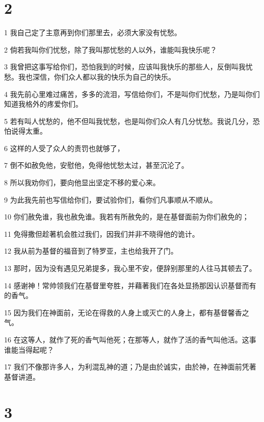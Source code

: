 \chapter{2}

\par 1 我自己定了主意再到你们那里去，必须大家没有忧愁。
\par 2 倘若我叫你们忧愁，除了我叫那忧愁的人以外，谁能叫我快乐呢？
\par 3 我曾把这事写给你们，恐怕我到的时候，应该叫我快乐的那些人，反倒叫我忧愁。我也深信，你们众人都以我的快乐为自己的快乐。
\par 4 我先前心里难过痛苦，多多的流泪，写信给你们，不是叫你们忧愁，乃是叫你们知道我格外的疼爱你们。
\par 5 若有叫人忧愁的，他不但叫我忧愁，也是叫你们众人有几分忧愁。我说几分，恐怕说得太重。
\par 6 这样的人受了众人的责罚也就够了，
\par 7 倒不如赦免他，安慰他，免得他忧愁太过，甚至沉沦了。
\par 8 所以我劝你们，要向他显出坚定不移的爱心来。
\par 9 为此我先前也写信给你们，要试验你们，看你们凡事顺从不顺从。
\par 10 你们赦免谁，我也赦免谁。我若有所赦免的，是在基督面前为你们赦免的；
\par 11 免得撒但趁著机会胜过我们，因我们并非不晓得他的诡计。
\par 12 我从前为基督的福音到了特罗亚，主也给我开了门。
\par 13 那时，因为没有遇见兄弟提多，我心里不安，便辞别那里的人往马其顿去了。
\par 14 感谢神！常帅领我们在基督里夸胜，并藉著我们在各处显扬那因认识基督而有的香气。
\par 15 因为我们在神面前，无论在得救的人身上或灭亡的人身上，都有基督馨香之气。
\par 16 在这等人，就作了死的香气叫他死；在那等人，就作了活的香气叫他活。这事谁能当得起呢？
\par 17 我们不像那许多人，为利混乱神的道；乃是由於诚实，由於神，在神面前凭著基督讲道。

\chapter{3}

